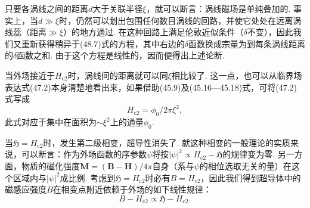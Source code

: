 只要各涡线之间的距离$d$大于关联半径$\xi$，就可以断言：涡线磁场是单纯叠加的. 事实上，当$d\gg\xi$时，仍然可以划出包围任何数目涡线的回路，并使它处处在远离涡线蕊（距离$\gg\xi$）的地方通过. 在这种回路上满足伦敦近似条件（$\delta$不变），因此我们又重新获得稍异于(48.7)式的方程，其中右边的$\delta$函数换成宗量为到每条涡线距离的$\delta$函数之和. 由于这个方程是线性的，因而便得出上述论断.

当外场接近于$H_{\mathrm{c}2}$时，涡线间的距离就可以同$\xi$相比较了. 这一点，也可以从临界场表达式(47.2)本身清楚地看出来，如果借助(45.9)及(45.16—45.18)式，可将(47.2)式写成
\begin{equation}
H_{\mathrm{c}2}=\phi_0/2\pi\xi^2,
\end{equation}
此式对应于集中在面积为$\sim\xi^2$上的通量$\phi_0$.

当$\mathfrak{H}=H_{\mathrm{c}2}$时，发生第二级相变，超导性消失了. 就这种相变的一般理论的实质来说，可以断言：作为外场函数的序参数$\psi$将按$|\psi|^2\propto H_{\mathrm{c}2}-\mathfrak{H}$的规律变为零. 另一方面，物质的磁化强度$\bm{M}=(\bm{B}-\bm{H})/4\pi$自身（系与$\psi$的相位选取无关的量）在这个区域内与$|\psi|^2$成比例. 考虑到$\mathfrak{H}=H_{\mathrm{c}2}$时必有$B=H_{\mathrm{c}2}$，因此我们得到超导体中的磁感应强度$B$在相变点附近依赖于外场的如下线性规律：
\begin{equation}
B-H_{\mathrm{c}2}\propto\mathfrak{H}-H_{\mathrm{c}2}.
\end{equation}


